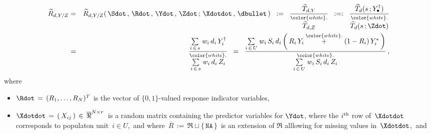 \begin{itemize}
    \begin{eqnarray*}
    \widetilde{R}_{d,Y/Z}
    & = &
        \widetilde{R}_{d,Y/Z}(\,
            \Sdot\,,\,
            \Rdot\,,\,
            \Ydot\,,\,
            \Zdot\,;\,
            \Xdotdot\,,\,
            \dbullet
            \,)
    \;\; := \;\;
        \dfrac{
            \widetilde{T}_{d,Y}
            }{
            \overset{{\color{white}.}}{
                \widehat{T}_{d,Z}
                }
            }
    \;\; :=: \;\;
        \dfrac{
            \widehat{T}_{d}(s\,;Y^{\dagger}_{\bullet})
            }{
            \overset{{\color{white}.}}{
                \widehat{T}_{d}(s\,;\Zdot)
                }
            }
    \\
    & = &
        \dfrac{
            \underset{i\,\in\,s}{\sum}\;w_{i}\,d_{i}\,Y^{\dagger}_{i}
            }{
            \overset{{\color{white}.}}{
                \underset{i\,\in\,s}{\sum}\;w_{i}\,d_{i}\,Z_{i}
                }
            }
    \;\; = \;\;
        \dfrac{
            \underset{i\,\in\,U}{\sum}\;w_{i}\,S_{i}\,d_{i}\left(\,
                R_{i}\,Y_{i}
                \overset{{\color{white}.}}{+}
                (1-R_{i})\,Y^{*}_{i}
                \,\right)
            }{
            \overset{{\color{white}.}}{
                \underset{i\,\in\,U}{\sum}\;w_{i}\,S_{i}\,d_{i}\,Z_{i}
                }
            }\,,
    \end{eqnarray*}
    where
    \begin{itemize}
    \item
        $\Rdot \,=\, (R_{1},\ldots,R_{N})^{T}$ is the vector of $\{0,1\}$-valued response indicator variables,
    \item
        $\Xdotdot \,=\, \left(\,X_{ij}\,\right) \,\in\, \overline{\Re}^{N \times r}$\,
        is a random matrix containing the predictor variables for $\Ydot$,
        where the $i^{\textnormal{th}}$ row of \,$\Xdotdot$\, corresponds to populaton unit \,$i \in U$,\,
        and where \,$\overline{R} \,:=\, \Re \sqcup \{\,\texttt{NA}\,\}$\,
        is an extension of $\Re$ alllowing for missing values in \,$\Xdotdot$,\, and

\end{itemize}
\end{itemize}
